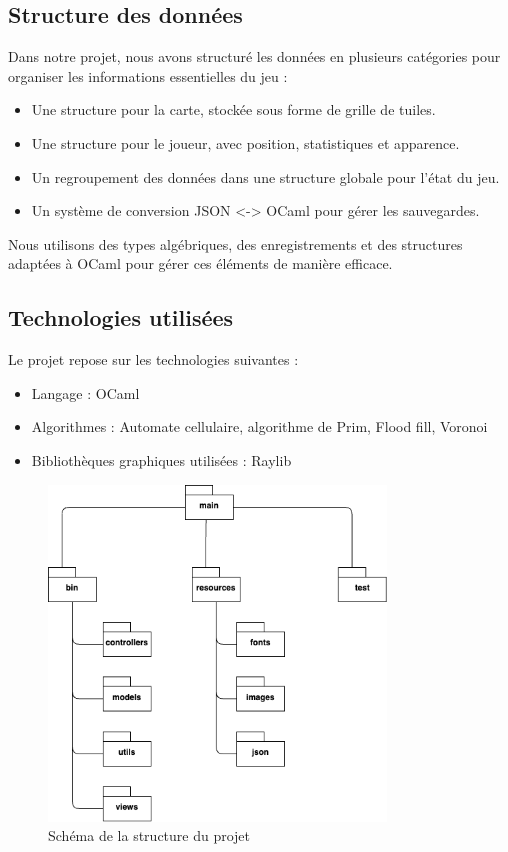 \documentclass{article}
\begin{document}
\subsection{Structure des données}
Dans notre projet, nous avons structuré les données en plusieurs catégories 
pour organiser les informations essentielles du jeu : 
\begin{itemize}
  \item Une structure pour la carte, stockée sous forme de grille de tuiles.
  \item Une structure pour le joueur, avec position, statistiques et apparence.
  \item Un regroupement des données dans une structure globale pour l’état du jeu.
  \item Un système de conversion JSON <-> OCaml pour gérer les sauvegardes.
\end{itemize}
Nous utilisons des types algébriques, des enregistrements et des structures 
adaptées à OCaml pour gérer ces éléments de manière efficace.

\subsection{Technologies utilisées}
Le projet repose sur les technologies suivantes :
\begin{itemize}
    \item Langage : OCaml
    \item Algorithmes : Automate cellulaire, algorithme de Prim, Flood fill, Voronoi
    \item Bibliothèques graphiques utilisées : Raylib
\end{itemize}

\begin{figure}
  \centering
  \includegraphics[width=0.8\textwidth]{structure.drawio.png}
  \caption{Schéma de la structure du projet}
\end{figure}
\end{document}

